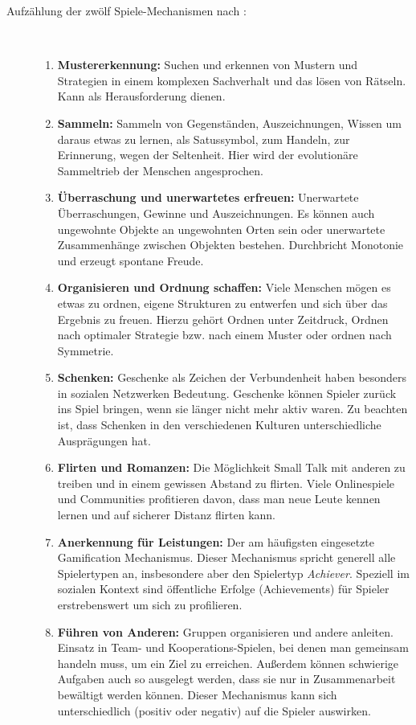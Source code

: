 \documentclass[a4paper,12pt]{scrartcl}
\begin{document}
\begin{description}
   \item[Aufzählung der zwölf Spiele-Mechanismen nach \cite{Zichermann2011}:]~\par
   \begin{enumerate}
      \item \textbf{Mustererkennung:} Suchen und erkennen von Mustern und Strategien in einem komplexen Sachverhalt und das lösen von Rätseln. Kann als Herausforderung dienen.
      \item \textbf{Sammeln:} Sammeln von Gegenständen, Auszeichnungen, Wissen um daraus etwas zu lernen, als Satussymbol, zum Handeln, zur Erinnerung, wegen der Seltenheit. Hier wird der evolutionäre Sammeltrieb der Menschen angesprochen.
      \item \textbf{Überraschung und unerwartetes erfreuen:} Unerwartete Überraschungen, Gewinne und Auszeichnungen. Es können auch ungewohnte Objekte an ungewohnten Orten sein oder unerwartete Zusammenhänge zwischen Objekten bestehen. Durchbricht Monotonie und erzeugt spontane Freude. 
      \item \textbf{Organisieren und Ordnung schaffen:} Viele Menschen mögen es etwas zu ordnen, eigene Strukturen zu entwerfen und sich über das Ergebnis zu freuen. Hierzu gehört Ordnen unter Zeitdruck, Ordnen nach optimaler Strategie bzw. nach einem Muster oder ordnen nach Symmetrie.
      \item \textbf{Schenken:} Geschenke als Zeichen der Verbundenheit haben besonders in sozialen Netzwerken Bedeutung. Geschenke können Spieler zurück ins Spiel bringen, wenn sie länger nicht mehr aktiv waren. Zu beachten ist, dass Schenken in den verschiedenen Kulturen unterschiedliche Ausprägungen hat.
      \item \textbf{Flirten und Romanzen:} Die Möglichkeit Small Talk mit anderen zu treiben und in einem gewissen Abstand zu flirten. Viele Onlinespiele und Communities profitieren davon, dass man neue Leute kennen lernen und auf sicherer Distanz flirten kann.
      \item \textbf{Anerkennung für Leistungen:} Der am häufigsten eingesetzte Gamification Mechanismus. Dieser Mechanismus spricht generell alle Spielertypen an, insbesondere aber den Spielertyp \textit{Achiever}. Speziell im sozialen Kontext sind öffentliche Erfolge (Achievements) für Spieler erstrebenswert um sich zu profilieren.
      \item \textbf{Führen von Anderen:} Gruppen organisieren und andere anleiten. Einsatz in Team- und Kooperations-Spielen, bei denen man gemeinsam handeln muss, um ein Ziel zu erreichen. Außerdem können schwierige Aufgaben auch so ausgelegt werden, dass sie nur in Zusammenarbeit bewältigt werden können. Dieser Mechanismus kann sich unterschiedlich (positiv oder negativ) auf die Spieler auswirken.  

\end{enumerate}
\end{description}
\end{document}
